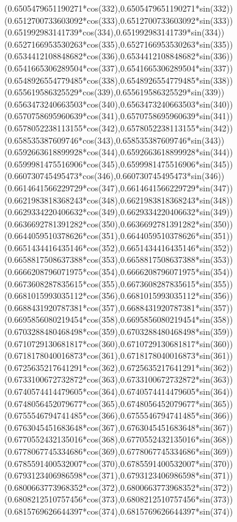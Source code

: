 {({0.6505479651190271*cos(332)},{0.6505479651190271*sin(332)})
({0.6512700733603092*cos(333)},{0.6512700733603092*sin(333)})
({0.651992983141739*cos(334)},{0.651992983141739*sin(334)})
({0.6527166953530263*cos(335)},{0.6527166953530263*sin(335)})
({0.6534412108848682*cos(336)},{0.6534412108848682*sin(336)})
({0.6541665306289504*cos(337)},{0.6541665306289504*sin(337)})
({0.6548926554779485*cos(338)},{0.6548926554779485*sin(338)})
({0.655619586325529*cos(339)},{0.655619586325529*sin(339)})
({0.6563473240663503*cos(340)},{0.6563473240663503*sin(340)})
({0.6570758695960639*cos(341)},{0.6570758695960639*sin(341)})
({0.6578052238113155*cos(342)},{0.6578052238113155*sin(342)})
({0.658535387609746*cos(343)},{0.658535387609746*sin(343)})
({0.6592663618899928*cos(344)},{0.6592663618899928*sin(344)})
({0.6599981475516906*cos(345)},{0.6599981475516906*sin(345)})
({0.660730745495473*cos(346)},{0.660730745495473*sin(346)})
({0.6614641566229729*cos(347)},{0.6614641566229729*sin(347)})
({0.6621983818368243*cos(348)},{0.6621983818368243*sin(348)})
({0.6629334220406632*cos(349)},{0.6629334220406632*sin(349)})
({0.6636692781391282*cos(350)},{0.6636692781391282*sin(350)})
({0.6644059510378626*cos(351)},{0.6644059510378626*sin(351)})
({0.6651434416435146*cos(352)},{0.6651434416435146*sin(352)})
({0.6658817508637388*cos(353)},{0.6658817508637388*sin(353)})
({0.6666208796071975*cos(354)},{0.6666208796071975*sin(354)})
({0.6673608287835615*cos(355)},{0.6673608287835615*sin(355)})
({0.6681015993035112*cos(356)},{0.6681015993035112*sin(356)})
({0.6688431920787381*cos(357)},{0.6688431920787381*sin(357)})
({0.6695856080219454*cos(358)},{0.6695856080219454*sin(358)})
({0.6703288480468498*cos(359)},{0.6703288480468498*sin(359)})
({0.6710729130681817*cos(360)},{0.6710729130681817*sin(360)})
({0.6718178040016873*cos(361)},{0.6718178040016873*sin(361)})
({0.6725635217641291*cos(362)},{0.6725635217641291*sin(362)})
({0.6733100672732872*cos(363)},{0.6733100672732872*sin(363)})
({0.6740574414479605*cos(364)},{0.6740574414479605*sin(364)})
({0.6748056452079677*cos(365)},{0.6748056452079677*sin(365)})
({0.6755546794741485*cos(366)},{0.6755546794741485*sin(366)})
({0.6763045451683648*cos(367)},{0.6763045451683648*sin(367)})
({0.6770552432135016*cos(368)},{0.6770552432135016*sin(368)})
({0.6778067745334686*cos(369)},{0.6778067745334686*sin(369)})
({0.6785591400532007*cos(370)},{0.6785591400532007*sin(370)})
({0.6793123406986598*cos(371)},{0.6793123406986598*sin(371)})
({0.6800663773968352*cos(372)},{0.6800663773968352*sin(372)})
({0.6808212510757456*cos(373)},{0.6808212510757456*sin(373)})
({0.6815769626644397*cos(374)},{0.6815769626644397*sin(374)})
}
